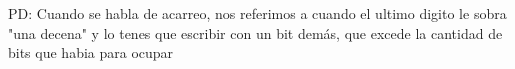 PD: Cuando se habla de acarreo, nos referimos a cuando el ultimo digito le sobra
"una decena" y lo tenes que escribir con un bit demás, que excede la cantidad de bits que
habia para ocupar
\begin{aportes}
  \item {}
  \item {}
\end{aportes}
